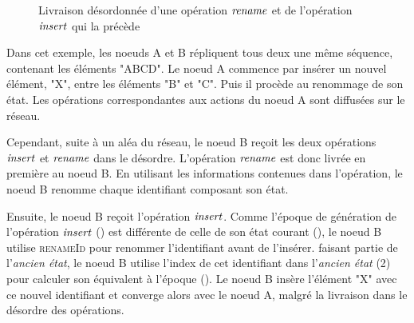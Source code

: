 \begin{figure}[!ht]
{
  }
  \caption{Livraison désordonnée d'une opération $\mathit{rename}$ et de l'opération $\mathit{insert}$ qui la précède}
  \label{fig:rls-out-of-order-rename}
\end{figure}

Dans cet exemple, les noeuds A et B répliquent tous deux une même séquence, contenant les éléments "ABCD".
Le noeud A commence par insérer un nouvel élément, "X", entre les éléments "B" et "C".
Puis il procède au renommage de son état.
Les opérations correspondantes aux actions du noeud A sont diffusées sur le réseau.

Cependant, suite à un aléa du réseau, le noeud B reçoit les deux opérations $\mathit{insert}$ et $\mathit{rename}$ dans le désordre.
L'opération $\mathit{rename}$ est donc livrée en première au noeud B.
En utilisant les informations contenues dans l'opération, le noeud B renomme chaque identifiant composant son état.

Ensuite, le noeud B reçoit l'opération $\mathit{insert}$.
Comme l'époque de génération de l'opération $\mathit{insert}$ () est différente de celle de son état courant (), le noeud B utilise \textsc{renameId} pour renommer l'identifiant avant de l'insérer.
 faisant partie de l'\emph{ancien état}, le noeud B utilise l'index de cet identifiant dans l'\emph{ancien état} (2) pour calculer son équivalent à l'époque  ().
Le noeud B insère l'élément "X" avec ce nouvel identifiant et converge alors avec le noeud A, malgré la livraison dans le désordre des opérations.
